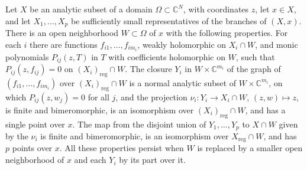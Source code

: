 \begin{lemma}\label{lem:normalization-local-construction}
Let $X$ be an analytic subset of a domain $\Omega\subset\mathbb C^N$, with coordinates $z$, let $x\in X$, and let $X_1,\ldots,X_p$ be sufficiently small representatives of the branches of $(X,x)$. There is an open neighborhood $W\subset\Omega$ of $x$ with the following properties. For each $i$ there are functions $f_{i1},\ldots,f_{im_i}$, weakly holomorphic on $X_i\cap W$, and monic polynomials $P_{ij}(z,T)$ in $T$ with coefficients holomorphic on $W$, such that $P_{ij}(z,f_{ij})=0$ on $(X_i)_{\mathrm{reg}}\cap W$. The closure $Y_i$ in $W\times\mathbb C^{m_i}$ of the graph of $(f_{i1},\ldots,f_{im_i})$ over $(X_i)_{\mathrm{reg}}\cap W$ is a normal analytic subset of $W\times\mathbb C^{m_i}$, on which $P_{ij}(z,w_j)=0$ for all $j$, and the projection $\nu_i\colon Y_i\to X_i\cap W$, $(z,w)\mapsto z$, is finite and bimeromorphic, is an isomorphism over $(X_i)_{\mathrm{reg}}\cap W$, and has a single point over $x$. The map from the disjoint union of $Y_1,\ldots,Y_p$ to $X\cap W$ given by the $\nu_i$ is finite and bimeromorphic, is an isomorphism over $X_{\mathrm{reg}}\cap W$, and has $p$ points over $x$. All these properties persist when $W$ is replaced by a smaller open neighborhood of $x$ and each $Y_i$ by its part over it.
\end{lemma}
